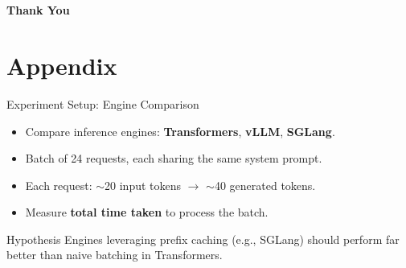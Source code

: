 \documentclass[Serif, 10pt, brown]{beamer}
\theoremstyle{example}
\theoremstyle{plain}
\begin{document}
\section{}
\begin{frame}
    \Huge{\centerline{\bf Thank You}}
\end{frame}

\section{Appendix}
\begin{frame}{Experiment Setup: Engine Comparison}
\begin{itemize}
    \item Compare inference engines: \textbf{Transformers}, \textbf{vLLM}, \textbf{SGLang}. \pause
    \item Batch of 24 requests, each sharing the same system prompt. \pause
    \item Each request: $\sim$20 input tokens $\rightarrow$ $\sim$40 generated tokens. \pause
    \item Measure \textbf{total time taken} to process the batch. \pause
\end{itemize}

\begin{block}{Hypothesis}
Engines leveraging prefix caching (e.g., SGLang) should perform far better than naive batching in Transformers.
\end{block}
\end{frame}
\end{document}
